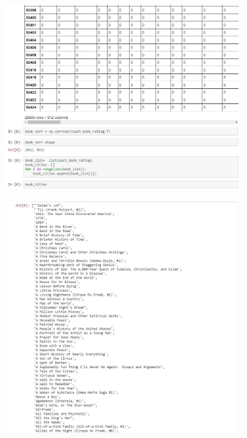 \begin{center}
\includegraphics[width=18cm, height=8cm]{./Imagenes/traba7.jpg}
\end{center}


\begin{center}
\includegraphics[width=14cm, height=10cm]{./Imagenes/traba8.jpg}
\end{center}


